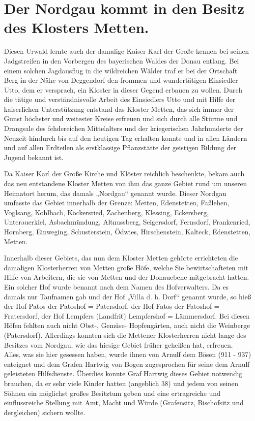\documentclass[12pt,a4paper]{book}
\begin{document}
\chapter[Im Besitz des Klosters Metten]{Der Nordgau kommt in den Besitz
des Klosters Metten.}

Diesen Urwald lernte auch der damalige Kaiser Karl der Große kennen bei
seinen Jadgstreifen in den Vorbergen des bayerischen Waldes der Donau
entlang. Bei einem solchen Jagdausflug in die wildreichen Wälder traf er
bei der Ortschaft Berg in der Nähe von Deggendorf den frommen und
wundertätigen Einsiedler Utto, dem er versprach, ein Kloster in dieser
Gegend erbauen zu wollen. Durch die tätige und verständnisvolle Arbeit
des Einsiedlers Utto und mit Hilfe der kaiserlichen Unterstützung
entstand das Kloster Metten, das sich immer der Gunst höchster und
weitester Kreise erfreuen und sich durch alle Stürme und Drangsale des
fehdereichen Mittelalters und der kriegerischen Jahrhunderte der Neuzeit
hindurch bis auf den heutigen Tag erhalten konnte und in allen Ländern
und auf allen Erdteilen als erstklassige Pflanzstätte der geistigen
Bildung der Jugend bekannt ist.

Da Kaiser Karl der Große Kirche und Klöster reichlich beschenkte, bekam
auch das neu entstandene Kloster Metten von ihm das ganze Gebiet rund um
unseren Heimatort herum, das damals „Nordgau“ genannt wurde. Dieser
Nordgau umfasste das Gebiet innerhalb der Grenze: Metten, Edenstetten,
Faßlehen, Voglsang, Kohlbach, Köckersried, Zachenberg, Klessing,
Eckersberg, Unterauerkiel, Asbachmündung, Altnussberg, Seigersdorf,
Fernsdorf, Frankenried, Hornberg, Einweging, Schusterstein, Ödwies,
Hirschenstein, Kalteck, Edenstetten, Metten.

Innerhalb dieser Gebiets, das nun dem Kloster Metten gehörte errichteten
die damaligen Klosterherren von Metten große Höfe, welche Sie
bewirtschafteten mit Hilfe von Arbeitern, die sie von Metten und der
Donauebene mitgebracht hatten. Ein solcher Hof wurde benannt nach dem
Namen des Hofverwalters. Da es damals nur Taufnamen gab und der Hof
„Villa d. h. Dorf“ genannt wurde, so hieß der Hof Patos der Patoshof =
Patersdorf, der Hof Fatos der Fatoshof = Fratersdorf, der Hof Lempfers
(Landfrit) Lempfershof = Lämmersdorf. Bei diesen Höfen fehlten auch
nicht Obst-, Gemüse- Hopfengärten, auch nicht die Weinberge
(Patersdorf). Allerdings konnten sich die Mettener Klosterherren nicht
lange des Besitzes vom Nordgau, wie das hiesige Gebiet früher geheißen
hat, erfreuen. Alles, was sie hier gesessen haben, wurde ihnen von
Arnulf dem Bösen (911 - 937) enteignet und dem Grafen Hartwig von Bogen
zugesprochen für seine dem Arnulf geleisteten Hilfsdienste. Überdies
konnte Graf Hartwig dieses Gebiet notwendig brauchen, da er sehr viele
Kinder hatten (angeblich 38) und jedem von seinen Söhnen ein möglichst
großes Besitztum geben und eine ertragreiche und einflussreiche Stellung
mit Amt, Macht und Würde (Grafensitz, Bischofsitz und dergleichen)
sichern wollte.
\end{document}
